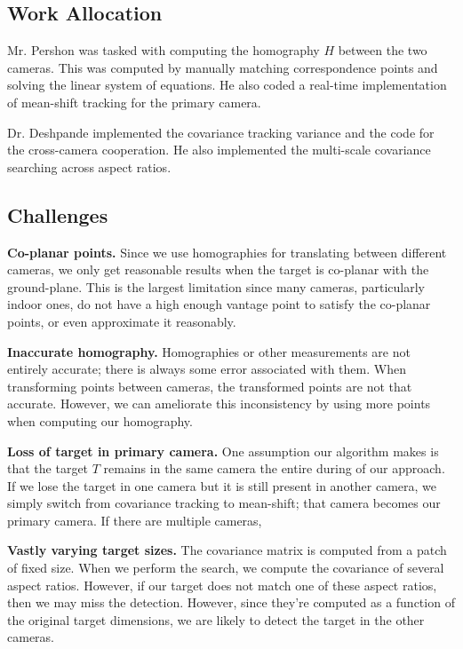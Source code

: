 \documentclass{article}
\begin{document}
\subsection{Work Allocation}
Mr. Pershon was tasked with computing the homography $H$ between the two cameras. This was computed by manually matching correspondence points and solving the linear system of equations. He also coded a real-time implementation of mean-shift tracking for the primary camera.

Dr. Deshpande implemented the covariance tracking variance and the code for the cross-camera cooperation. He also implemented the multi-scale covariance searching across aspect ratios.

\subsection{Challenges}
\vspace{5pt}
\noindent\textbf{Co-planar points.} Since we use homographies for translating between different cameras, we only get reasonable results when the target is co-planar with the ground-plane. This is the largest limitation since many cameras, particularly indoor ones, do not have a high enough vantage point to satisfy the co-planar points, or even approximate it reasonably.

\vspace{5pt}
\noindent\textbf{Inaccurate homography.} Homographies or other measurements are not entirely accurate; there is always some error associated with them. When transforming points between cameras, the transformed points are not that accurate. However, we can ameliorate this inconsistency by using more points when computing our homography.

\vspace{5pt}
\noindent\textbf{Loss of target in primary camera.} One assumption our algorithm makes is that the target $T$ remains in the same camera the entire during of our approach. If we lose the target in one camera but it is still present in another camera, we simply switch from covariance tracking to mean-shift; that camera becomes our primary camera. If there are multiple cameras, 

\vspace{5pt}
\noindent\textbf{Vastly varying target sizes.} The covariance matrix is computed from a patch of fixed size. When we perform the search, we compute the covariance of several aspect ratios. However, if our target does not match one of these aspect ratios, then we may miss the detection. However, since they're computed as a function of the original target dimensions, we are likely to detect the target in the other cameras.
\end{document}
